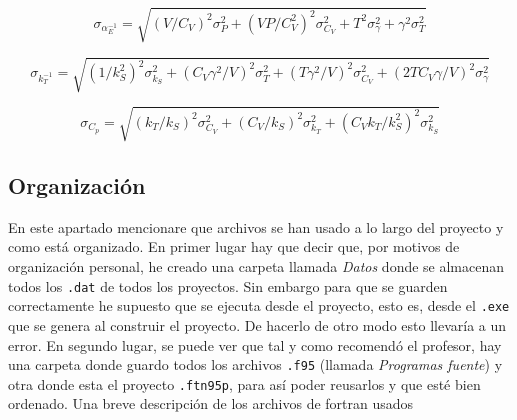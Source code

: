 \documentclass[11pt]{article} %
\begin{document}
\begin{equation}
	\sigma_{\alpha_E^{-1}} =\sqrt{(V/C_V)^2\sigma_P^2+(VP/C_V^2)^2 \sigma_{C_V}^2 +T^2  \sigma_{\gamma}^2 + \gamma^2 \sigma_T^2}
\end{equation}

\begin{equation}
	\sigma_{k_T^{-1}} =\sqrt{(1/k_S^2)^2 \sigma_{k_S}^2+ (C_V\gamma^2/V)^2 \sigma_{T}^2+ (T\gamma^2/V)^2 \sigma_{C_V}^2+ (2TC_V\gamma/V)^2 \sigma_{\gamma}^2}
\end{equation}

\begin{equation}
	\sigma_{C_p} =\sqrt{(k_T/k_S)^2 \sigma_{C_V}^2 + (C_V/k_S)^2 \sigma_{k_T}^2 + (C_Vk_T /k_S^2)^2 \sigma_{k_S}^2}
\end{equation}



\subsection{Organización} \label{Subsec:02}

En este apartado mencionare que archivos se han usado a lo largo del proyecto y como está organizado. En primer lugar hay que decir que, por motivos de organización personal, he creado una carpeta llamada \textit{Datos} donde se almacenan todos los \texttt{.dat} de todos los proyectos. Sin embargo para que se guarden correctamente he supuesto que se ejecuta desde el proyecto, esto es, desde el \texttt{.exe} que se genera al construir el proyecto. De hacerlo de otro modo esto llevaría a un error. En segundo lugar, se puede ver que tal y como recomendó el profesor, hay una carpeta donde guardo todos los archivos \texttt{.f95} (llamada \textit{Programas fuente}) y otra donde esta el proyecto \texttt{.ftn95p}, para así poder reusarlos y que esté bien ordenado. Una breve descripción de los archivos de fortran usados
\end{document}
